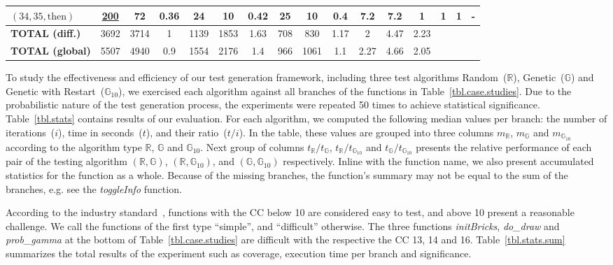 \documentclass[sigconf,review,anonymous]{acmart}
\newcommand{\thenBr}{\text{then}}
\newcommand{\un}[1]{\underline{#1}}
\newcommand{\Random}{\mathbb{R}}
\newcommand{\Genetic}{\mathbb{G}}
\newcommand{\RGenetic}{\mathbb{G}_{10}}
\begin{document}
\begin{table}[!t]
\begin{tabular}{l|ccc|ccc|ccc|ccc|ccc}
    $(34,35,\thenBr)$        & \un{200} & 72   & 0.36      & 24  & 10   & 0.42          & 25  & 10  & 0.4              & 7.2    & 7.2   & 1      & 1 & 1 &  -  \\
    \midrule
    \textbf{TOTAL (diff.)}           & 3692     & 3714 & 1         & 1139 & 1853 & 1.63         & 708 & 830 & 1.17             & 2      & 4.47  & 2.23   &   &   &    \\
    \bottomrule
    \bottomrule  
    \textbf{TOTAL (global)} & 5507      & 4940 & 0.9       & 1554 & 2176 & 1.4          & 966 & 1061 & 1.1             & 2.27   & 4.66  & 2.05       &   &   &    \\  
    \bottomrule
    \end{tabular}
\end{table}

To study the effectiveness and efficiency of our test generation framework, including three test algorithms Random~($\Random$), Genetic~($\Genetic$) and Genetic with Restart~($\RGenetic$), we exercised each algorithm against all branches of the functions in Table~\ref{tbl.case.studies}. Due to the probabilistic nature of the test generation process, the experiments were repeated 50 times to achieve statistical significance. Table~\ref{tbl.stats} contains results of our evaluation. For each algorithm, we computed the following median values per branch: the number of iterations~($i$), time in seconds~($t$), and their ratio~($t/i$). In the table, these values are grouped into three columns $m_{\Random}$, $m_{\Genetic}$ and $m_{\RGenetic}$ according to the algorithm type $\Random$, $\Genetic$ and $\RGenetic$. Next group of columns $t_{\Random}/t_{\Genetic}$, $t_{\Random}/t_{\RGenetic}$ and $t_{\Genetic}/t_{\RGenetic}$ presents the relative performance of each pair of the testing algorithm $(\Random,\Genetic)$, $(\Random,\RGenetic)$, and $(\Genetic,\RGenetic)$ respectively. Inline with the function name, we also present accumulated statistics for the function as a whole. Because of the missing branches, the function's summary may not be equal to the sum of the branches, e.g. see the \emph{toggleInfo} function. 

According to the industry standard~\cite{bray1997c4}, functions with the CC below 10 are considered easy to test, and above 10 present a reasonable challenge. We call the functions of the first type ``simple'', and ``difficult'' otherwise. The three functions \emph{initBricks}, \emph{do_draw} and \emph{prob_gamma} at the bottom of Table~\ref{tbl.case.studies} are difficult with the respective the CC 13, 14 and 16. Table~\ref{tbl.stats.sum} summarizes the total results of the experiment such as coverage, execution time per branch and significance.
\end{document}

